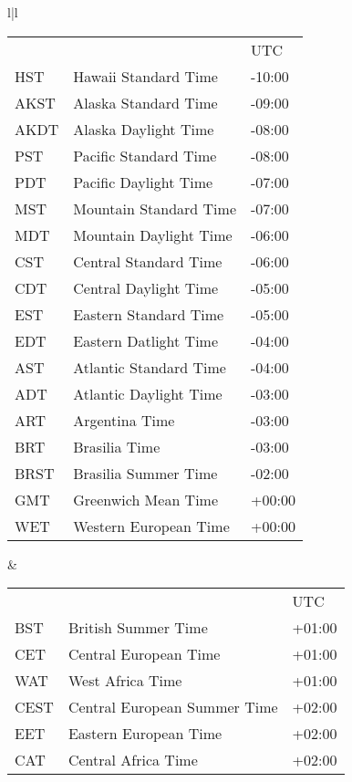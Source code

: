 \documentclass[12pt]{article}
\newlength{\figurewidth}
\newenvironment{boxedfigure}[1][!btp]%
	{\begin{figure*}[#1]
	 \begin{lrbox}{\figurebox}
	 \begin{minipage}{\figurewidth}

	 \vspace*{1ex}}%
	{
	 \vspace*{1ex}

	 \end{minipage}
	 \end{lrbox}
	 \begin{center}
	 \fbox{\hspace*{0.1in}\usebox{\figurebox}\hspace*{0.1in}}
	 \end{center}
	 \end{figure*}}
\begin{document}
\begin{boxedfigure}[t]
\begin{center}
\begin{tabular}{l|l}
\begin{tabular}{@{}lll@{}}
      &                               & UTC \\
HST   & Hawaii Standard Time          & -10:00 \\
AKST  & Alaska Standard Time          & -09:00 \\
AKDT  & Alaska Daylight Time          & -08:00 \\
PST   & Pacific Standard Time         & -08:00 \\
PDT   & Pacific Daylight Time         & -07:00 \\
MST   & Mountain Standard Time        & -07:00 \\
MDT   & Mountain Daylight Time        & -06:00 \\
CST   & Central Standard Time         & -06:00 \\
CDT   & Central Daylight Time         & -05:00 \\
EST   & Eastern Standard Time         & -05:00 \\
EDT   & Eastern Datlight Time         & -04:00 \\
AST   & Atlantic Standard Time        & -04:00 \\
ADT   & Atlantic Daylight Time        & -03:00 \\
ART   & Argentina Time                & -03:00 \\
BRT   & Brasilia Time                 & -03:00 \\
BRST  & Brasilia Summer Time          & -02:00 \\
GMT   & Greenwich Mean Time           & +00:00 \\
WET   & Western European Time         & +00:00 \\
\end{tabular}
&
\begin{tabular}{@{}lll@{}}
      &                               & UTC \\
BST   & British Summer Time           & +01:00 \\
CET   & Central European Time         & +01:00 \\
WAT   & West Africa Time              & +01:00 \\
CEST  & Central European Summer Time  & +02:00 \\
EET   & Eastern European Time         & +02:00 \\
CAT   & Central Africa Time           & +02:00 \\

\end{tabular}
\end{tabular}
\end{center}
\end{boxedfigure}
\end{document}
